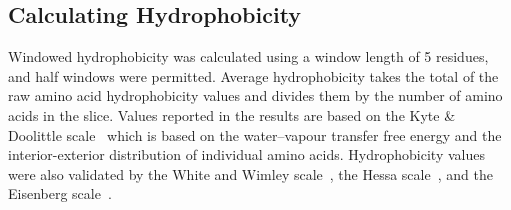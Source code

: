 \subsection{Calculating Hydrophobicity}
Windowed hydrophobicity was calculated using a window length of 5 residues, and half windows were permitted.
Average hydrophobicity takes the total of the raw amino acid hydrophobicity values and divides them by the number of amino acids in the slice.
Values reported in the results are based on the Kyte \& Doolittle scale~\cite{Kyte1982} which is based on the water\---vapour transfer free energy and the interior-exterior distribution of individual amino acids.
Hydrophobicity values were also validated by the White and Wimley scale~\cite{White1999}, the Hessa scale~\cite{Hessa2005}, and the Eisenberg scale~\cite{Eisenberg1984}.
